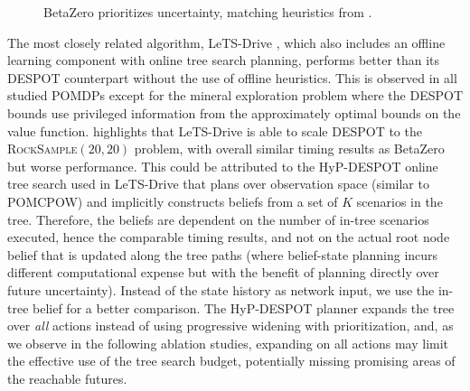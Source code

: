 \begin{figure}[t]
    \centering
    \hfill
    \caption{BetaZero prioritizes uncertainty, matching heuristics from \textcite{mern2023intelligent}.}
    \label{fig:minex}
\end{figure}


The most closely related algorithm, LeTS-Drive \cite{cai2022closing}, which also includes an offline learning component with online tree search planning, performs better than its DESPOT counterpart without the use of offline heuristics.
This is observed in all studied POMDPs except for the mineral exploration problem where the DESPOT bounds use privileged information from the approximately optimal bounds on the value function.
 highlights that LeTS-Drive is able to scale DESPOT to the \textsc{RockSample}$(20,20)$ problem, with overall similar timing results as BetaZero but worse performance.
This could be attributed to the HyP-DESPOT online tree search used in LeTS-Drive that plans over observation space (similar to POMCPOW) and implicitly constructs beliefs from a set of $K$ scenarios in the tree.
Therefore, the beliefs are dependent on the number of in-tree scenarios executed, hence the comparable timing results, and not on the actual root node belief that is updated along the tree paths (where belief-state planning incurs different computational expense but with the benefit of planning directly over future uncertainty).
Instead of the state history as network input, we use the in-tree belief for a better comparison.
The HyP-DESPOT planner expands the tree over \textit{all} actions instead of using progressive widening with prioritization, and, as we observe in the following ablation studies, expanding on all actions may limit the effective use of the tree search budget, potentially missing promising areas of the reachable futures.


